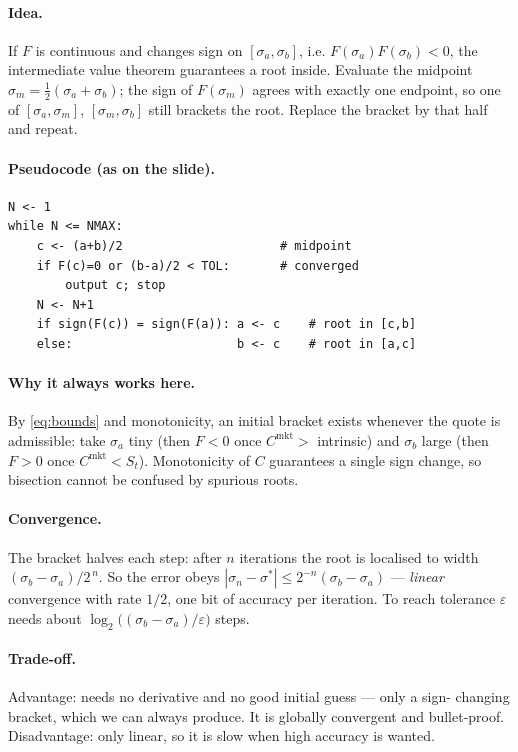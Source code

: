 \documentclass[11pt]{article}
\newcommand{\mkt}{\mathrm{mkt}}
\begin{document}
\paragraph{Idea.} If $F$ is continuous and changes sign on $[\sigma_a,\sigma_b]$, i.e.
$F(\sigma_a)F(\sigma_b)<0$, the intermediate value theorem guarantees a root inside. Evaluate the
midpoint $\sigma_m=\tfrac12(\sigma_a+\sigma_b)$; the sign of $F(\sigma_m)$ agrees with exactly one
endpoint, so one of $[\sigma_a,\sigma_m]$, $[\sigma_m,\sigma_b]$ still brackets the root. Replace
the bracket by that half and repeat.

\paragraph{Pseudocode (as on the slide).}
\begin{verbatim}
N <- 1
while N <= NMAX:
    c <- (a+b)/2                      # midpoint
    if F(c)=0 or (b-a)/2 < TOL:       # converged
        output c; stop
    N <- N+1
    if sign(F(c)) = sign(F(a)): a <- c    # root in [c,b]
    else:                       b <- c    # root in [a,c]
\end{verbatim}

\paragraph{Why it always works here.} By \eqref{eq:bounds} and monotonicity, an initial bracket
exists whenever the quote is admissible: take $\sigma_a$ tiny (then $F<0$ once
$C^{\mkt}>$ intrinsic) and $\sigma_b$ large (then $F>0$ once $C^{\mkt}<S_t$). Monotonicity of $C$
guarantees a single sign change, so bisection cannot be confused by spurious roots.

\paragraph{Convergence.} The bracket halves each step: after $n$ iterations the root is localised
to width $(\sigma_b-\sigma_a)/2^{\,n}$. So the error obeys
$|\sigma_n-\sigma^*|\le 2^{-n}(\sigma_b-\sigma_a)$ --- \emph{linear} convergence with rate $1/2$,
one bit of accuracy per iteration. To reach tolerance $\varepsilon$ needs about
$\log_2\!\big((\sigma_b-\sigma_a)/\varepsilon\big)$ steps.

\paragraph{Trade-off.} Advantage: needs no derivative and no good initial guess --- only a sign-
changing bracket, which we can always produce. It is globally convergent and bullet-proof.
Disadvantage: only linear, so it is slow when high accuracy is wanted.
\end{document}
